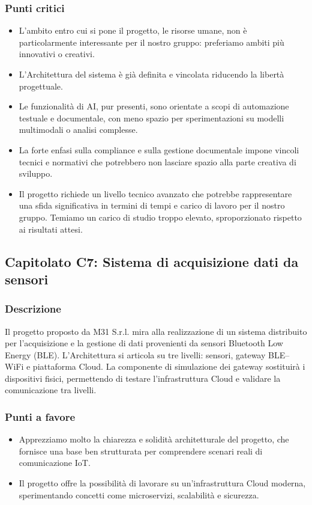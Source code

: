 \documentclass[a4paper,12pt]{article}
\begin{document}
\subsubsection{Punti critici}
\begin{itemize}
    \item L’ambito entro cui si pone il progetto, le risorse umane, non è particolarmente interessante per il nostro gruppo: preferiamo ambiti più innovativi o creativi.
    \item L’Architettura del sistema è già definita e vincolata riducendo la libertà progettuale.
    \item Le funzionalità di AI, pur presenti, sono orientate a scopi di automazione testuale e documentale, con meno spazio per sperimentazioni su modelli multimodali o analisi complesse.
    \item La forte enfasi sulla compliance e sulla gestione documentale impone vincoli tecnici e normativi che potrebbero non lasciare spazio alla parte creativa di sviluppo.
    \item Il progetto richiede un livello tecnico avanzato che potrebbe rappresentare una sfida significativa in termini di tempi e carico di lavoro per il nostro gruppo. Temiamo un carico di studio troppo elevato, sproporzionato rispetto ai risultati attesi.
\end{itemize}





\subsection{Capitolato C7: Sistema di acquisizione dati da sensori}

\subsubsection{Descrizione}
Il progetto proposto da M31 S.r.l. mira alla realizzazione di un sistema distribuito per l’acquisizione e la gestione di dati provenienti da sensori Bluetooth Low Energy (BLE). L’Architettura si articola su tre livelli: sensori, gateway BLE–WiFi e piattaforma Cloud. La componente di simulazione dei gateway sostituirà i dispositivi fisici, permettendo di testare l’infrastruttura Cloud e validare la comunicazione tra livelli.

\subsubsection{Punti a favore}
\begin{itemize}
    \item Apprezziamo molto la chiarezza e solidità architetturale del progetto, che fornisce una base ben strutturata per comprendere scenari reali di comunicazione IoT.
    \item Il progetto offre la possibilità di lavorare su un’infrastruttura Cloud moderna, sperimentando concetti come microservizi, scalabilità e sicurezza.
\end{itemize}
\end{document}
